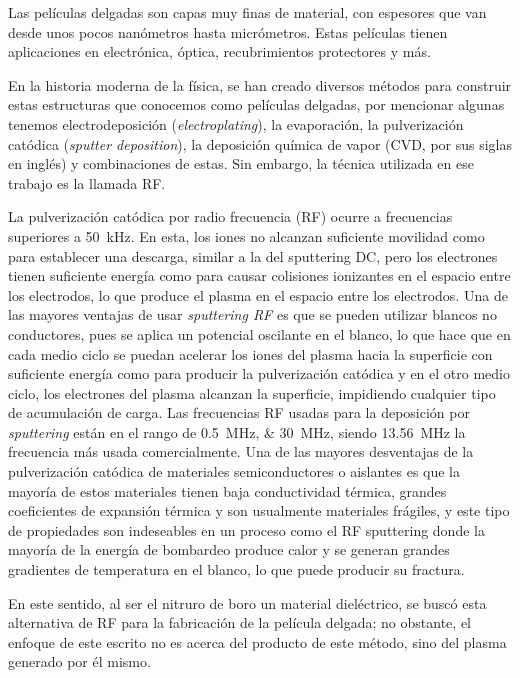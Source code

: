 \documentclass[12pt]{IEEEtran}
\begin{document}
Las películas delgadas son capas muy finas de material, con espesores que van desde unos pocos nanómetros hasta micrómetros. Estas películas tienen aplicaciones en electrónica, óptica, recubrimientos protectores y más.

En la historia moderna de la física, se han creado diversos métodos para construir estas estructuras que conocemos como películas delgadas, por mencionar algunas tenemos electrodeposición (\emph{electroplating}), la evaporación, la pulverización catódica (\emph{sputter deposition}), la deposición química de vapor  (CVD, por sus siglas en inglés) y combinaciones de estas. Sin embargo, la técnica utilizada en ese trabajo es la llamada RF.

La pulverización catódica por radio frecuencia (RF)\cite{mastertesis2017} ocurre a frecuencias superiores a \qty{50}{\kHz}. En esta, los iones no alcanzan suficiente movilidad como para establecer una descarga, similar a la del sputtering DC, pero los electrones tienen suficiente energía como para causar colisiones ionizantes en el espacio entre los electrodos, lo que produce el plasma en el espacio entre los electrodos. Una de las mayores ventajas de usar \emph{sputtering RF} es que se pueden utilizar blancos no conductores, pues se aplica un potencial oscilante en el blanco, lo que hace que en cada medio ciclo se puedan acelerar los iones del plasma hacia la superficie con suficiente energía como para producir la pulverización catódica y en el otro medio ciclo, los electrones del plasma alcanzan la superficie, impidiendo cualquier tipo de acumulación de carga. Las frecuencias RF usadas para la deposición por \emph{sputtering} están en el rango de \qtylist[list-units=single]{0.5;30}{\MHz}, siendo \qty{13.56}{\MHz} la frecuencia más usada comercialmente. Una de las mayores desventajas de la pulverización catódica de materiales semiconductores o aislantes es que la mayoría de estos materiales tienen baja conductividad térmica, grandes coeficientes de expansión térmica y son usualmente materiales frágiles, y este tipo de propiedades son indeseables en un proceso como el RF sputtering donde la mayoría de la energía de bombardeo produce calor y se generan grandes gradientes de temperatura en el blanco, lo que puede producir su fractura.

En este sentido, al ser el nitruro de boro un material dieléctrico, se buscó esta alternativa de RF para la fabricación de la película delgada; no obstante, el enfoque de este escrito no es acerca del producto de este método, sino del plasma generado por él mismo.
\end{document}
